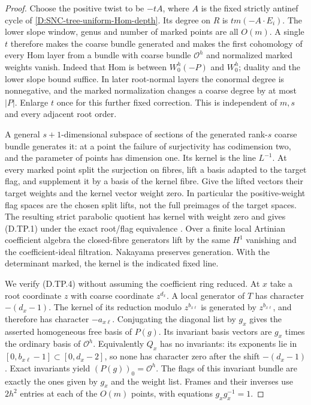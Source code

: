 \begin{proof}
Choose the positive twist to be $-tA$, where $A$ is the
fixed strictly antinef cycle of
\ref{D:SNC-tree-uniform-Hom-depth}. Its degree on $R$ is
$tm(-A\cdot E_i)$. The lower slope window, genus and
number of marked points are all $O(m)$. A single $t$
therefore makes the coarse bundle generated and makes
the first cohomology of every Hom layer from a bundle
with coarse bundle $\mathcal O^h$ and normalized marked
weights vanish. Indeed that Hom is between $W_0^h(-P)$
and $W_0^h$; duality and the lower slope bound suffice.
In later root-normal layers the conormal degree is
nonnegative, and the marked normalization changes a
coarse degree by at most $|P|$. Enlarge $t$ once for
this further fixed correction. This is independent
of $m,s$ and every adjacent root order.

A general $s+1$-dimensional subspace of sections of the
generated rank-$s$ coarse bundle generates it: at a
point the failure of surjectivity has codimension two,
and the parameter of points has dimension one. Its
kernel is the line $L^{-1}$. At every marked point
split the surjection on fibres, lift a basis adapted
to the target flag, and supplement it by a basis of
the kernel fibre. Give the lifted vectors their
target weights and the kernel vector weight zero.
In particular the positive-weight flag spaces are
the chosen split lifts, not the full preimages of
the target spaces. The resulting strict parabolic
quotient has kernel with weight zero and
gives (D.TP.1) under the exact root/flag equivalence
\citep[Proposition3 and Theorem4]{Borne2007D}
\citep[Theorem6.1]{BorneVistoli2012D}.
Over a finite local Artinian coefficient algebra the
closed-fibre generators lift by the same $H^1$
vanishing and the coefficient-ideal filtration.
Nakayama preserves generation. With the determinant
marked, the kernel is the indicated fixed line.

We verify (D.TP.4) without assuming the coefficient
ring reduced. At $x$ take a root coordinate $z$ with
coarse coordinate $z^{d_x}$. A local generator of $T$
has character $-(d_x-1)$. The kernel of its reduction
modulo $z^{b_{x\ell}}$ is generated by
$z^{b_{x\ell}}$, and therefore has character
$-a_{x\ell}$. Conjugating the diagonal list by $g_x$
gives the asserted homogeneous free basis of $P(g)$.
Its invariant basis vectors are $g_x$ times the
ordinary basis of $\mathcal O^h$. Equivalently $Q_x$
has no invariants: its exponents lie in
$[0,b_{x\ell}-1]\subset[0,d_x-2]$, so none has
character zero after the shift $-(d_x-1)$. Exact
invariants yield $(P(g))_0=\mathcal O^h$.
The flags of this invariant bundle are exactly the
ones given by $g_x$ and the weight list. Frames and
their inverses use $2h^2$ entries at each of the
$O(m)$ points, with equations $g_xg_x^{-1}=1$.


\end{proof}
